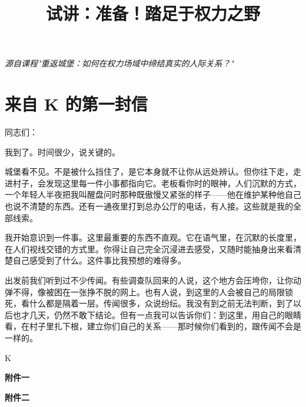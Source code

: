 \documentclass[12pt,a4paper]{article}
\title{\bfseries 试讲：准备！踏足于权力之野}
\author{}
\date{}
\begin{document}
\maketitle
\thispagestyle{fancy}
\vspace{-2em}

\begin{center}
\small\itshape 源自课程"重返城堡：如何在权力场域中缔结真实的人际关系？"
\end{center}

\vspace{1em}

\section{来自 K 的第一封信}

同志们：

我到了。时间很少，说关键的。

城堡看不见。不是被什么挡住了，是它本身就不让你从远处辨认。但你往下走，走进村子，会发现这里每一件小事都指向它。老板看你时的眼神，人们沉默的方式，一个年轻人半夜把我叫醒盘问时那种既傲慢又紧张的样子——他在维护某种他自己也说不清楚的东西。还有一通夜里打到总办公厅的电话，有人接。这些就是我的全部线索。

我开始意识到一件事。这里最重要的东西不直观。它在语气里，在沉默的长度里，在人们视线交错的方式里。你得让自己完全沉浸进去感受，又随时能抽身出来看清楚自己感受到了什么。这件事比我预想的难得多。

出发前我们听到过不少传闻。有些调查队回来的人说，这个地方会压垮你，让你动弹不得，像被困在一张挣不脱的网上。也有人说，到这里的人会被自己的局限锁死，看什么都是隔着一层。传闻很多，众说纷纭。我没有到之前无法判断，到了以后也才几天，仍然不敢下结论。但有一点我可以告诉你们：到这里，用自己的眼睛看，在村子里扎下根，建立你们自己的关系——那时候你们看到的，跟传闻不会是一样的。

\begin{flushright}
K
\end{flushright}

\vspace{1em}
\newpage
{\large\bfseries 附件一}

\vspace{1.5em}
{\large\bfseries 附件二}

\end{document}
